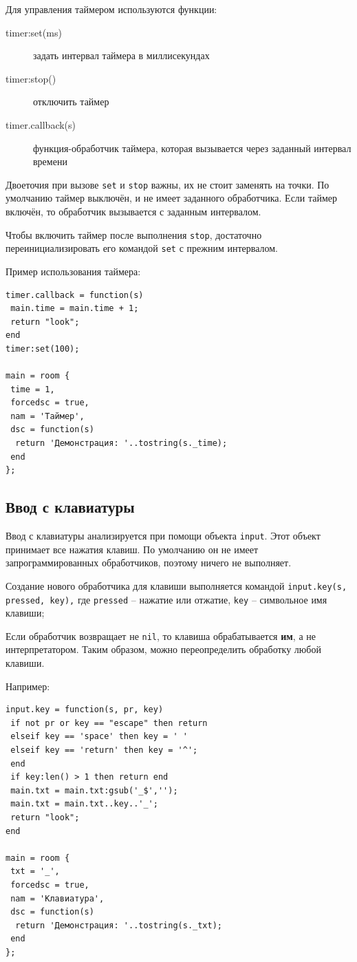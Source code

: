 \documentclass[12pt]{article}
\begin{document}
Для управления таймером используются функции:

\begin{description}
\item[timer:set(ms)] задать интервал таймера в миллисекундах
\item[timer:stop()] отключить таймер
\item[timer.callback(s)] функция-обработчик таймера, которая вызывается через заданный интервал времени
\end{description}

Двоеточия при вызове \verb/set/ и \verb/stop/ важны, их не стоит заменять на точки. По умолчанию таймер выключён, и не имеет заданного обработчика. Если таймер включён, то обработчик вызывается с заданным интервалом.

Чтобы включить таймер после выполнения \verb/stop/, достаточно переинициализировать его командой \verb/set/ с прежним интервалом.

Пример использования таймера:

\begin{verbatim}
timer.callback = function(s)
 main.time = main.time + 1;
 return "look";
end
timer:set(100);

main = room {
 time = 1,
 forcedsc = true,
 nam = 'Таймер',
 dsc = function(s)
  return 'Демонстрация: '..tostring(s._time);
 end
};
\end{verbatim}

\subsection{Ввод с клавиатуры}
\label{objects_input}
Ввод с клавиатуры анализируется при помощи объекта \verb/input/. Этот объект принимает все нажатия клавиш. По умолчанию он не имеет запрограммированных обработчиков, поэтому ничего не выполняет.

Создание нового обработчика для клавиши выполняется командой \verb/input.key(s, pressed, key),/ где \verb/pressed/ -- нажатие или отжатие, \verb/key/ -- символьное имя клавиши;

Если обработчик возвращает не \verb/nil/, то клавиша обрабатывается \textbf{им}, а не интерпретатором. Таким образом, можно переопределить обработку любой клавиши.

Например:

\begin{verbatim}
input.key = function(s, pr, key)
 if not pr or key == "escape" then return
 elseif key == 'space' then key = ' '
 elseif key == 'return' then key = '^';
 end
 if key:len() > 1 then return end
 main.txt = main.txt:gsub('_$','');
 main.txt = main.txt..key..'_';
 return "look";
end

main = room {
 txt = '_',
 forcedsc = true,
 nam = 'Клавиатура',
 dsc = function(s)
  return 'Демонстрация: '..tostring(s._txt);
 end
};
\end{verbatim}
\end{document}
